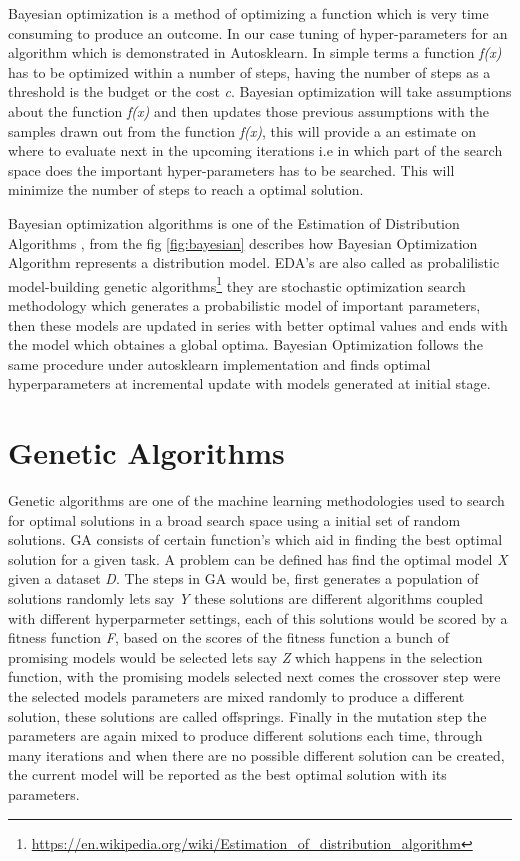 Bayesian optimization is a method of optimizing a function which is very time consuming to produce an outcome. In our case tuning of hyper-parameters for an algorithm which is demonstrated in Autosklearn\cite{autosklearn}. In simple terms a function \textit{f(x)} has to be optimized within a number of steps, having the number of steps as a threshold is the budget or the cost \textit{c}. Bayesian optimization will take assumptions about the function \textit{f(x)} and then updates those previous assumptions with the samples drawn out from the function \textit{f(x)}, this will provide a an estimate on where to evaluate next in the upcoming iterations i.e in which part of the search space does the important hyper-parameters has to be searched. This will minimize the number of steps to reach a optimal solution.

Bayesian optimization algorithms is one of the Estimation  of Distribution Algorithms \cite{bayesian}, from the fig \ref{fig:bayesian} describes how Bayesian Optimization Algorithm represents a distribution model. EDA's are also called as probalilistic model-building genetic algorithms\footnote{\url{https://en.wikipedia.org/wiki/Estimation_of_distribution_algorithm}} they are stochastic optimization search methodology which generates a probabilistic model of important parameters, then these models are updated in series with better optimal values and ends with the model which obtaines a global optima. Bayesian Optimization follows the same procedure under autosklearn implementation and finds optimal hyperparameters at incremental update with models generated at initial stage.

\section{Genetic Algorithms}
Genetic algorithms are one of the machine learning methodologies used to search for optimal solutions in a broad search space using a initial set of random solutions. GA consists of certain function's which aid in finding the best optimal solution for a given task. A problem can be defined has find the optimal model \textit{X}  given a dataset \textit{D}. The steps in GA would be, first generates a  population of solutions randomly lets say \textit{Y} these solutions are different algorithms coupled with different hyperparmeter settings, each of this solutions would be scored by a fitness function \textit{F}, based on the scores of the fitness function a bunch of promising models would be selected lets say \textit{Z} which happens in the selection function, with the promising models selected next comes the crossover step were the selected models parameters are mixed randomly to produce a different solution, these solutions are called offsprings. Finally in the mutation step the parameters are again mixed to produce different solutions each time, through many iterations and when there are no possible different solution can be created, the current model will be reported as the best optimal solution with its parameters.\cite{genetic} 

